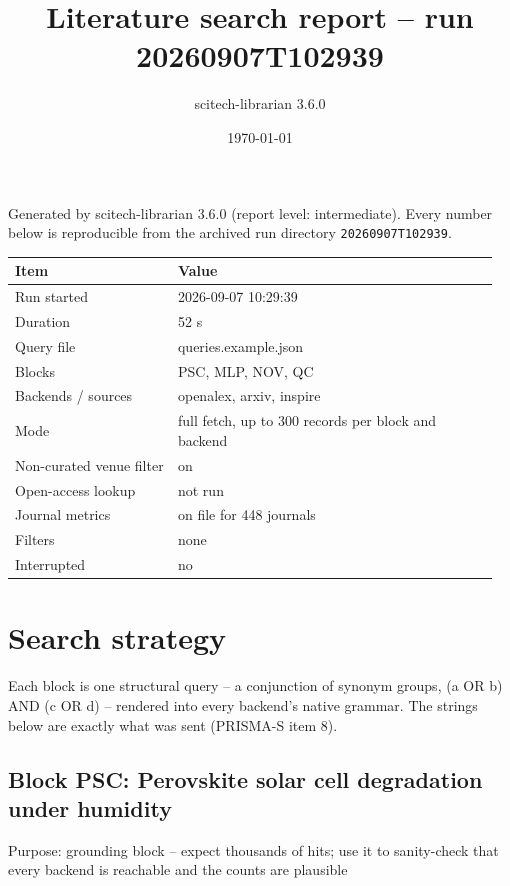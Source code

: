 \documentclass[10pt,a4paper]{article}
\title{Literature search report -- run 20260907T102939}\author{scitech-librarian 3.6.0}\date{\today}
\begin{document}
\maketitle
Generated by scitech-librarian 3.6.0 (report level: intermediate). Every number below is reproducible from the archived run directory \texttt{20260907T102939}.

{\scriptsize\begin{longtable}{p{0.322\linewidth}p{0.633\linewidth}}
\hline
\textbf{Item} & \textbf{Value} \\ \hline
\endhead
Run started & 2026-09-07 10:29:39 \\
Duration & 52 s \\
Query file & queries.example.json \\
Blocks & PSC, MLP, NOV, QC \\
Backends / sources & openalex, arxiv, inspire \\
Mode & full fetch, up to 300 records per block and backend \\
Non-curated venue filter & on \\
Open-access lookup & not run \\
Journal metrics & on file for 448 journals \\
Filters & none \\
Interrupted & no \\
\hline
\end{longtable}}
\section*{Search strategy}
Each block is one structural query -- a conjunction of synonym groups, (a OR b) AND (c OR d) -- rendered into every backend's native grammar. The strings below are exactly what was sent (PRISMA-S item 8).

\subsection*{Block PSC: Perovskite solar cell degradation under humidity}
Purpose: grounding block -- expect thousands of hits; use it to sanity-check that every backend is reachable and the counts are plausible
\end{document}
